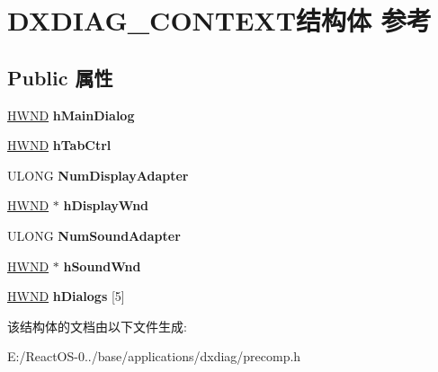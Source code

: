 \hypertarget{struct_d_x_d_i_a_g___c_o_n_t_e_x_t}{}\section{D\+X\+D\+I\+A\+G\+\_\+\+C\+O\+N\+T\+E\+X\+T结构体 参考}
\label{struct_d_x_d_i_a_g___c_o_n_t_e_x_t}
\subsection*{Public 属性}
\begin{DoxyCompactItemize}
\item 
\mbox{\label{struct_d_x_d_i_a_g___c_o_n_t_e_x_t_a24141f44a8c244b4c0899bcff389587c}} 
\hyperlink{interfacevoid}{H\+W\+ND} {\bfseries h\+Main\+Dialog}
\item 
\mbox{\label{struct_d_x_d_i_a_g___c_o_n_t_e_x_t_ae800cc9b2da8f196a8b779eaa28b7572}} 
\hyperlink{interfacevoid}{H\+W\+ND} {\bfseries h\+Tab\+Ctrl}
\item 
\mbox{\label{struct_d_x_d_i_a_g___c_o_n_t_e_x_t_ac13c30ed0e5ceb9dd4151fd674709f47}} 
U\+L\+O\+NG {\bfseries Num\+Display\+Adapter}
\item 
\mbox{\label{struct_d_x_d_i_a_g___c_o_n_t_e_x_t_aaa457eaa195b9832866c546f4b05b079}} 
\hyperlink{interfacevoid}{H\+W\+ND} $\ast$ {\bfseries h\+Display\+Wnd}
\item 
\mbox{\label{struct_d_x_d_i_a_g___c_o_n_t_e_x_t_a861a632b8ecd7a4f90fa610cea270b3a}} 
U\+L\+O\+NG {\bfseries Num\+Sound\+Adapter}
\item 
\mbox{\label{struct_d_x_d_i_a_g___c_o_n_t_e_x_t_a79a52b462de854abcd83aca3b0538a16}} 
\hyperlink{interfacevoid}{H\+W\+ND} $\ast$ {\bfseries h\+Sound\+Wnd}
\item 
\mbox{\label{struct_d_x_d_i_a_g___c_o_n_t_e_x_t_ae617c47dc5aaba2ee16aa4762d59c3cd}} 
\hyperlink{interfacevoid}{H\+W\+ND} {\bfseries h\+Dialogs} \mbox{[}5\mbox{]}
\end{DoxyCompactItemize}


该结构体的文档由以下文件生成\+:\begin{DoxyCompactItemize}
\item 
E\+:/\+React\+O\+S-\/0../base/applications/dxdiag/precomp.\+h\end{DoxyCompactItemize}
